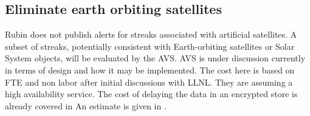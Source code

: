 
\subsection{Eliminate earth orbiting satellites} \label{sec:4eliminate}

Rubin does not publish alerts for streaks associated with artificial satellites.
A subset of streaks, potentially consistent with Earth-orbiting satellites or Solar System objects, will be evaluated by the AVS.
AVS is under discussion currently in terms of design and how it may be implemented.
The cost here is based on FTE  and non labor after initial discussions with LLNL.
They are assuming a high availability service.
The cost of delaying the data in an encrypted store is already covered in 
An estimate is given in .




